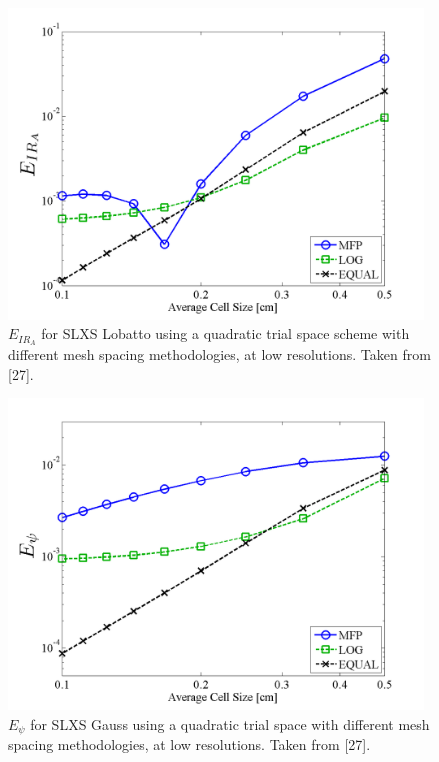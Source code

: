 \pagebreak
%
\begin{figure}[!htp]
\centering
\includegraphics[width=11cm]{chapter3_variable_xs/LOW_RES_P2_LOBATTO_E_IR_A.png}
\caption{$E_{IR_A}$ for SLXS Lobatto using a quadratic trial space scheme with different mesh spacing methodologies, at low resolutions.  Taken from [27].}
\label{fig:low_res_lobatto_ir_A}
\end{figure}
\begin{figure}[!hbp]
\centering
\includegraphics[width=11cm]{chapter3_variable_xs/LOW_RES_P2_GAUSS_E_PSI.png}
\caption{$E_{\psi}$ for SLXS Gauss using a quadratic trial space with different mesh spacing methodologies, at low resolutions.  Taken from [27].}
\label{fig:low_res_gauss_psi}
\end{figure}
%
